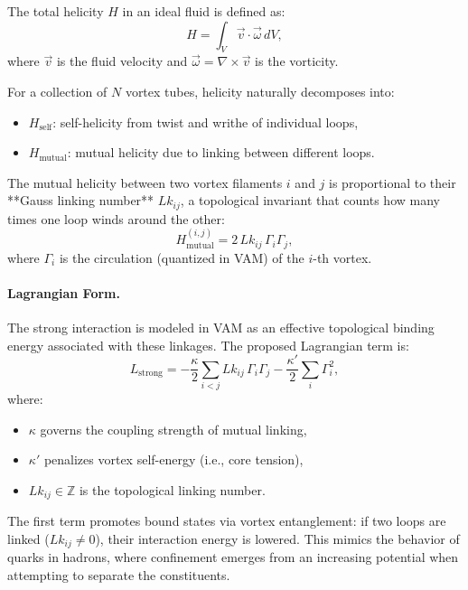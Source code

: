 The total helicity \( H \) in an ideal fluid is defined as:
\[
H = \int_V \vec{v} \cdot \vec{\omega} \, dV,
\]
where \( \vec{v} \) is the fluid velocity and \( \vec{\omega} = \nabla \times \vec{v} \) is the vorticity.

For a collection of \( N \) vortex tubes, helicity naturally decomposes into:
\begin{itemize}
    \item \( H_{\text{self}} \): self-helicity from twist and writhe of individual loops,
    \item \( H_{\text{mutual}} \): mutual helicity due to linking between different loops.
\end{itemize}

The mutual helicity between two vortex filaments \( i \) and \( j \) is proportional to their **Gauss linking number** \( Lk_{ij} \), a topological invariant that counts how many times one loop winds around the other:
\[
H_{\text{mutual}}^{(i,j)} = 2\, Lk_{ij} \, \Gamma_i \Gamma_j,
\]
where \( \Gamma_i \) is the circulation (quantized in VAM) of the \( i \)-th vortex.

\vspace{0.5em}
\paragraph{Lagrangian Form.} The strong interaction is modeled in VAM as an effective topological binding energy associated with these linkages. The proposed Lagrangian term is:
\begin{equation}
    L_{\text{strong}} = -\frac{\kappa}{2} \sum_{i<j} Lk_{ij} \, \Gamma_i \Gamma_j
    - \frac{\kappa'}{2} \sum_i \Gamma_i^2,
    \label{eq:strong-lagrangian}
\end{equation}
where:
\begin{itemize}
    \item \( \kappa \) governs the coupling strength of mutual linking,
    \item \( \kappa' \) penalizes vortex self-energy (i.e., core tension),
    \item \( Lk_{ij} \in \mathbb{Z} \) is the topological linking number.
\end{itemize}

The first term promotes bound states via vortex entanglement: if two loops are linked (\( Lk_{ij} \neq 0 \)), their interaction energy is lowered. This mimics the behavior of quarks in hadrons, where confinement emerges from an increasing potential when attempting to separate the constituents.

